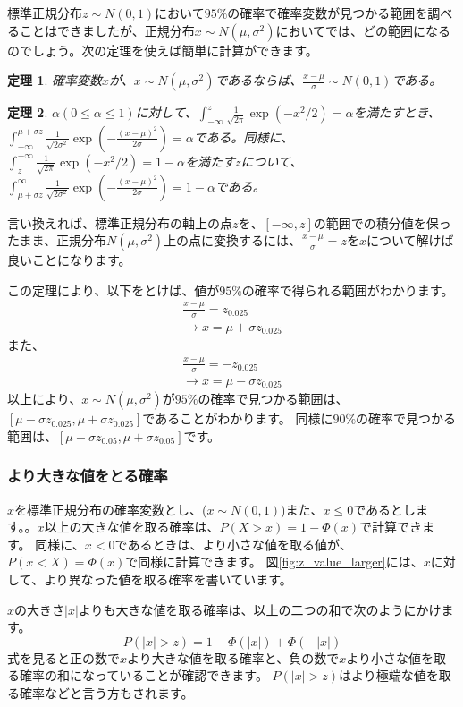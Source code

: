 \documentclass[a4paper,11pt,dvipdfmx]{jsarticle}
\newtheorem{theo}{定理}[section]
\begin{document}
標準正規分布$z\sim N(0,1)$において$95\%$の確率で確率変数が見つかる範囲を調べることはできましたが、正規分布$x\sim N(\mu,\sigma^2)$においてでは、どの範囲になるのでしょう。次の定理を使えば簡単に計算ができます。
\begin{theo}
    確率変数$x$が、$x\sim N(\mu,\sigma^2)$であるならば、$\frac{x-\mu}{\sigma}\sim N(0,1)$である。    
\end{theo}
\begin{theo}
$\alpha(0\leq \alpha\leq 1)$に対して、$\int_{-\infty}^{z}\frac{1}{\sqrt{2\pi}}\exp(-x^2/2)=\alpha$を満たすとき、$\int_{-\infty}^{\mu+\sigma z} \frac{1}{\sqrt{2\sigma^2}}\exp(-\frac{(x-\mu)^2}{2\sigma})=\alpha$である。同様に、$\int_{z}^{-\infty}\frac{1}{\sqrt{2\pi}}\exp(-x^2/2)=1-\alpha$を満たす$z$について、$\int_{\mu+\sigma z}^{\infty} \frac{1}{\sqrt{2\sigma^2}}\exp(-\frac{(x-\mu)^2}{2\sigma})=1-\alpha$である。
\end{theo}
言い換えれば、標準正規分布の軸上の点$z$を、$[-\infty,z]$の範囲での積分値を保ったまま、正規分布$N(\mu,\sigma^2)$上の点に変換するには、$\frac{x-\mu}{\sigma}=z$を$x$について解けば良いことになります。

この定理により、以下をとけば、値が$95\%$の確率で得られる範囲がわかります。
\begin{eqnarray*}
    \frac{x-\mu}{\sigma}=z_{0.025}\\
    \rightarrow x = \mu+\sigma z_{0.025}
\end{eqnarray*}
また、
\begin{eqnarray*}
    \frac{x-\mu}{\sigma}=-z_{0.025}\\
    \rightarrow x = \mu-\sigma z_{0.025}
\end{eqnarray*}
以上により、$x \sim N(\mu,\sigma^2)$が$95\%$の確率で見つかる範囲は、$[\mu-\sigma z_{0.025},\mu+\sigma z_{0.025}]$であることがわかります。
同様に$90\%$の確率で見つかる範囲は、$[\mu-\sigma z_{0.05},\mu+\sigma z_{0.05}]$です。

\subsubsection{より大きな値をとる確率}
$x$を標準正規分布の確率変数とし、($x\sim N(0,1)$)また、$x\leq 0$であるとします。。$x$以上の大きな値を取る確率は、$P(X>x)=1-\varPhi(x)$で計算できます。
同様に、$x < 0$であるときは、より小さな値を取る値が、$P(x<X)=\varPhi(x)$で同様に計算できます。
図\ref{fig:z_value_larger}には、$x$に対して、より異なった値を取る確率を書いています。

$x$の大きさ$|x|$よりも大きな値を取る確率は、以上の二つの和で次のようにかけます。
\begin{equation}
    P(|x|>z) = 1-\varPhi(|x|)+\varPhi(-|x|)
\end{equation}
式を見ると正の数で$x$より大きな値を取る確率と、負の数で$x$より小さな値を取る確率の和になっていることが確認できます。
$P(|x|>z)$はより極端な値を取る確率などと言う方もされます。
\end{document}
